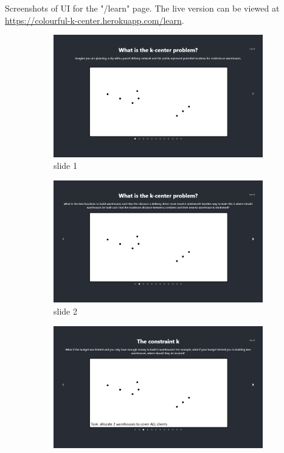 Screenshots of UI for the "/learn" page. The live version can be viewed at \url{https://colourful-k-center.herokuapp.com/learn}.

\begin{figure}[H]
    \begin{subfigure}{0.5\textwidth}
        \centering
        \includegraphics[width=\textwidth]{images/learn_00-base.png}
        \caption{slide 1}
    \end{subfigure}
    \vspace{0.75cm}
    \begin{subfigure}{0.5\textwidth}
        \centering
        \includegraphics[width=\textwidth]{images/learn_01-base.png}
        \caption{slide 2}
    \end{subfigure}
    \vspace{0.75cm}
    \begin{subfigure}{0.5\textwidth}
        \centering
        \includegraphics[width=\textwidth]{images/learn_02-base.png}

\end{subfigure}
\end{figure}
